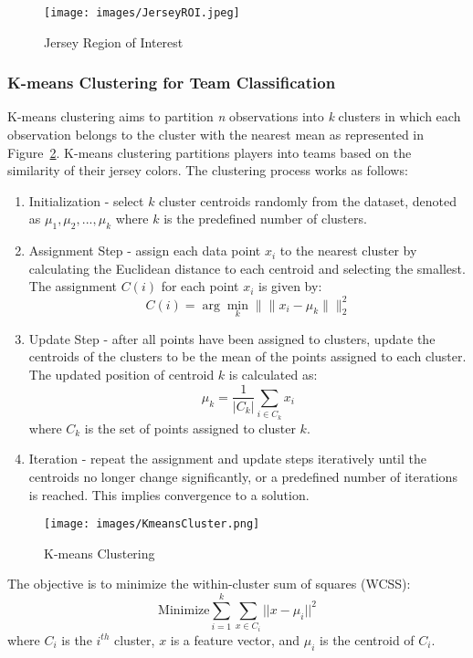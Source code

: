 \documentclass[12pt, letterpaper]{article}
\begin{document}
{\begin{spacing}{1.2}
\begin{figure}[htbp]
\centering
\texttt{[image: images/JerseyROI.jpeg]}
\captionsetup{font=large}
\caption{Jersey Region of Interest}
\label{fig:JerseyROI}
\end{figure}

\subsubsection{K-means Clustering for Team Classification}

K-means clustering aims to partition \textit{n} observations into \textit{k} clusters in which each observation belongs to the cluster with the nearest mean as represented in Figure~\ref{fig:KmeansCluster}. K-means clustering partitions players into teams based on the similarity of their jersey colors. The
clustering process works as follows:

\begin{enumerate}
    \item Initialization - select \(k\) cluster centroids randomly from the dataset, denoted as \(\mu_1, \mu_2, ..., \mu_k\) where \(k\) is the predefined number of clusters.
    \item Assignment Step - assign each data point \(x_i\) to the nearest cluster by calculating the Euclidean distance to each centroid and selecting the smallest. The assignment \(C(i)\) for each point \(x_i\) is given by:
    \[ C(i) = \arg\min_{k} \|\|x_i - \mu_k\|\|_2^2 \]
    \item Update Step - after all points have been assigned to clusters, update the centroids of the clusters to be the mean of the points assigned to each cluster. The updated position of centroid \(k\) is calculated as:
    \[ \mu_k = \frac{1}{|C_k|} \sum_{i \in C_k} x_i \]
    where \(C_k\) is the set of points assigned to cluster \(k\).
    \item Iteration - repeat the assignment and update steps iteratively until the centroids no longer change significantly, or a predefined number of iterations is reached. This implies convergence to a solution.
\end{enumerate}

\begin{figure}[htbp]
\centering
\texttt{[image: images/KmeansCluster.png]}
\captionsetup{font=large}
\caption{K-means Clustering}
\label{fig:KmeansCluster}
\end{figure}


The objective is to minimize the within-cluster sum of squares (WCSS):
\[ \text{Minimize} \sum_{i=1}^{k}\sum_{x \in C_i} ||x - \mu_i||^2 \]
where \(C_i\) is the $i^{th}$ cluster, \(x\) is a feature vector, and \(\mu_i\) is the centroid of \(C_i\). 


\end{spacing}}
\end{document}
